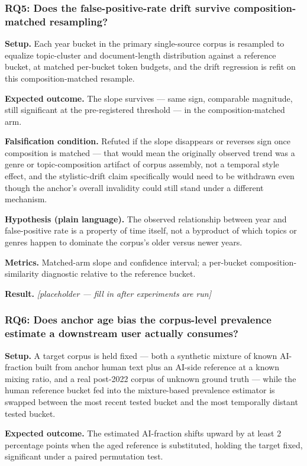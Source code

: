 \documentclass[11pt]{article}
\newcommand{\ph}{\textit{[placeholder --- fill in after experiments are run]}}
\begin{document}
\subsubsection{RQ5: Does the false-positive-rate drift survive composition-matched resampling?}
\textbf{Setup.} Each year bucket in the primary single-source corpus is resampled to equalize topic-cluster and document-length distribution against a reference bucket, at matched per-bucket token budgets, and the drift regression is refit on this composition-matched resample.

\textbf{Expected outcome.} The slope survives --- same sign, comparable magnitude, still significant at the pre-registered threshold --- in the composition-matched arm.

\textbf{Falsification condition.} Refuted if the slope disappears or reverses sign once composition is matched --- that would mean the originally observed trend was a genre or topic-composition artifact of corpus assembly, not a temporal style effect, and the stylistic-drift claim specifically would need to be withdrawn even though the anchor's overall invalidity could still stand under a different mechanism.

\textbf{Hypothesis (plain language).} The observed relationship between year and false-positive rate is a property of time itself, not a byproduct of which topics or genres happen to dominate the corpus's older versus newer years.

\textbf{Metrics.} Matched-arm slope and confidence interval; a per-bucket composition-similarity diagnostic relative to the reference bucket.

\textbf{Result.} \ph

\subsubsection{RQ6: Does anchor age bias the corpus-level prevalence estimate a downstream user actually consumes?}
\textbf{Setup.} A target corpus is held fixed --- both a synthetic mixture of known AI-fraction built from anchor human text plus an AI-side reference at a known mixing ratio, and a real post-2022 corpus of unknown ground truth --- while the human reference bucket fed into the mixture-based prevalence estimator is swapped between the most recent tested bucket and the most temporally distant tested bucket.

\textbf{Expected outcome.} The estimated AI-fraction shifts upward by at least 2 percentage points when the aged reference is substituted, holding the target fixed, significant under a paired permutation test.
\end{document}
